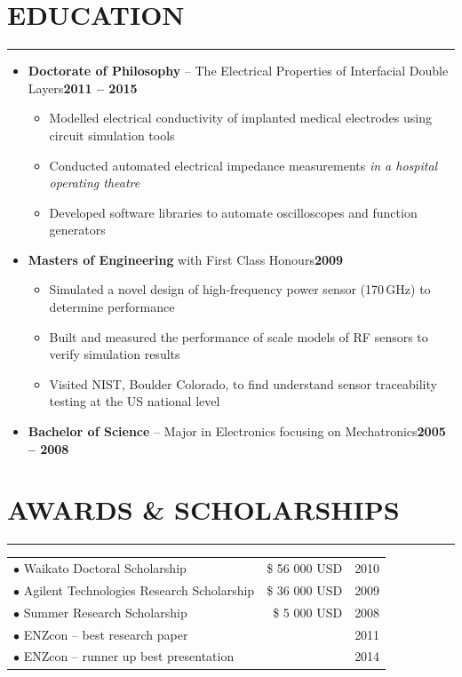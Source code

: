 \documentclass[english]{extarticle}
\newcommand{\mySect}[2]{
    \section*{\textcolor{secondary}{#1}\hfill{\footnotesize\textmd{{#2}}}}
    \vspace{-2em}
    \textcolor{tertiary}{\hrule}
    \vspace{0.5em}
}
\begin{document}
\mySect{EDUCATION}{}

\begin{itemize}

    \item \textbf{Doctorate of Philosophy} -- The Electrical Properties of Interfacial Double Layers\textbf{\footnotesize\hfill 2011 -- 2015}\begin{itemize}
        \item Modelled electrical conductivity of implanted medical electrodes using circuit simulation tools
        \item Conducted automated electrical impedance measurements \emph{in a hospital operating theatre}
        \item Developed software libraries to automate oscilloscopes and function generators
    \end{itemize}
    \item \textbf{Masters of Engineering} with First Class Honours\textbf{\footnotesize\hfill 2009}
    \begin{itemize}
        \item Simulated a novel design of high-frequency power sensor (170\,GHz) to determine performance
        \item Built and measured the performance of scale models of RF sensors to verify simulation results
        \item Visited NIST, Boulder Colorado, to find understand sensor traceability testing at the US national level
    \end{itemize}
    \item \textbf{Bachelor of Science} -- Major in Electronics focusing on Mechatronics\textbf{\footnotesize\hfill 2005 -- 2008}
\end{itemize}


\vspace{1.0cm}

\mySect{AWARDS \& SCHOLARSHIPS}{}
\begin{tabular}{lrr}
$\bullet$ Waikato Doctoral Scholarship & \$ 56 000 USD & 2010 \\
$\bullet$ Agilent Technologies Research Scholarship & \$ 36 000 USD & 2009 \\
$\bullet$ Summer Research Scholarship & \$ 5 000 USD & 2008 \\
$\bullet$ ENZcon -- best research paper & & 2011 \\
$\bullet$ ENZcon -- runner up best presentation \hspace{6.1cm} & & \hspace{0.7cm} 2014 \\
\end{tabular}
\end{document}
